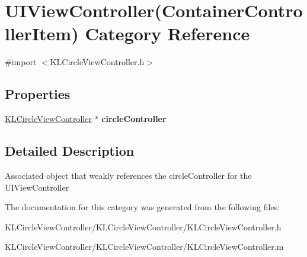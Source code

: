 \hypertarget{category_u_i_view_controller_07_container_controller_item_08}{\section{U\-I\-View\-Controller(Container\-Controller\-Item) Category Reference}
\label{category_u_i_view_controller_07_container_controller_item_08}
}


{\ttfamily \#import $<$K\-L\-Circle\-View\-Controller.\-h$>$}

\subsection*{Properties}
\begin{DoxyCompactItemize}
\item 
\hypertarget{category_u_i_view_controller_07_container_controller_item_08_af4a28ff4e6eecd2f80ab561f3edc22ba}{\hyperlink{interface_k_l_circle_view_controller}{K\-L\-Circle\-View\-Controller} $\ast$ {\bfseries circle\-Controller}}\label{category_u_i_view_controller_07_container_controller_item_08_af4a28ff4e6eecd2f80ab561f3edc22ba}

\end{DoxyCompactItemize}


\subsection{Detailed Description}
Associated object that weakly references the circle\-Controller for the U\-I\-View\-Controller 

The documentation for this category was generated from the following files\-:\begin{DoxyCompactItemize}
\item 
K\-L\-Circle\-View\-Controller/\-K\-L\-Circle\-View\-Controller/K\-L\-Circle\-View\-Controller.\-h\item 
K\-L\-Circle\-View\-Controller/\-K\-L\-Circle\-View\-Controller/K\-L\-Circle\-View\-Controller.\-m\end{DoxyCompactItemize}
